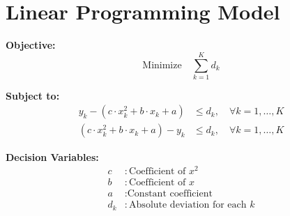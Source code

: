 \documentclass{article}
\begin{document}
\section*{Linear Programming Model}

\textbf{Objective:}
\[
\text{Minimize} \quad \sum_{k=1}^{K} d_k
\]

\textbf{Subject to:}
\begin{align*}
y_k - (c \cdot x_k^2 + b \cdot x_k + a) &\leq d_k, \quad \forall k = 1, \ldots, K \\
(c \cdot x_k^2 + b \cdot x_k + a) - y_k &\leq d_k, \quad \forall k = 1, \ldots, K
\end{align*}

\textbf{Decision Variables:}
\begin{align*}
c &: \text{Coefficient of } x^2 \\
b &: \text{Coefficient of } x \\
a &: \text{Constant coefficient} \\
d_k &: \text{Absolute deviation for each } k
\end{align*}
\end{document}
